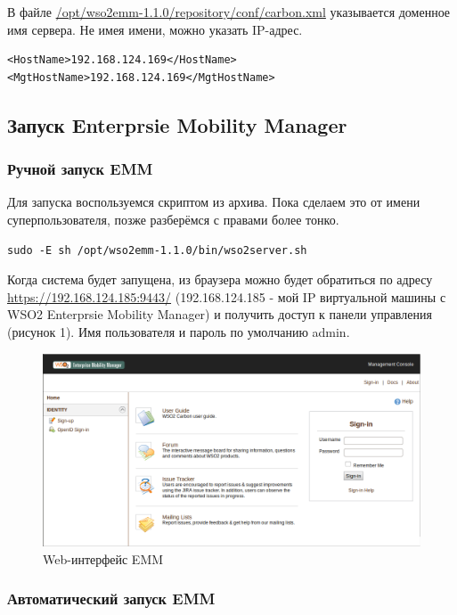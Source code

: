 \documentclass[a4paper, 12pt]{article}		%
\begin{document}
В файле \url{/opt/wso2emm-1.1.0/repository/conf/carbon.xml} указывается доменное имя сервера. Не имея имени, можно указать IP-адрес.

\begin{Verbatim}[frame=single]
<HostName>192.168.124.169</HostName>
<MgtHostName>192.168.124.169</MgtHostName>
\end{Verbatim}

\subsection{Запуск Enterprsie Mobility Manager}

\subsubsection{Ручной запуск EMM}

Для запуска воспользуемся скриптом из архива. Пока сделаем это от имени суперпользователя, позже разберёмся с правами более тонко.
\begin{Verbatim}[frame=single]
sudo -E sh /opt/wso2emm-1.1.0/bin/wso2server.sh
\end{Verbatim}

Когда система будет запущена, из браузера можно будет обратиться по адресу \url{https://192.168.124.185:9443/} (192.168.124.185 - мой IP виртуальной машины с WSO2 Enterprsie Mobility Manager) и получить доступ к панели управления (рисунок 1). Имя пользователя и пароль по умолчанию admin.

\begin{figure}[h!]
\centering
\includegraphics[scale=0.45]{res/EMM001}
\caption{Web-интерфейс EMM}
\end{figure}

\subsubsection{Автоматический запуск EMM}
\end{document}
